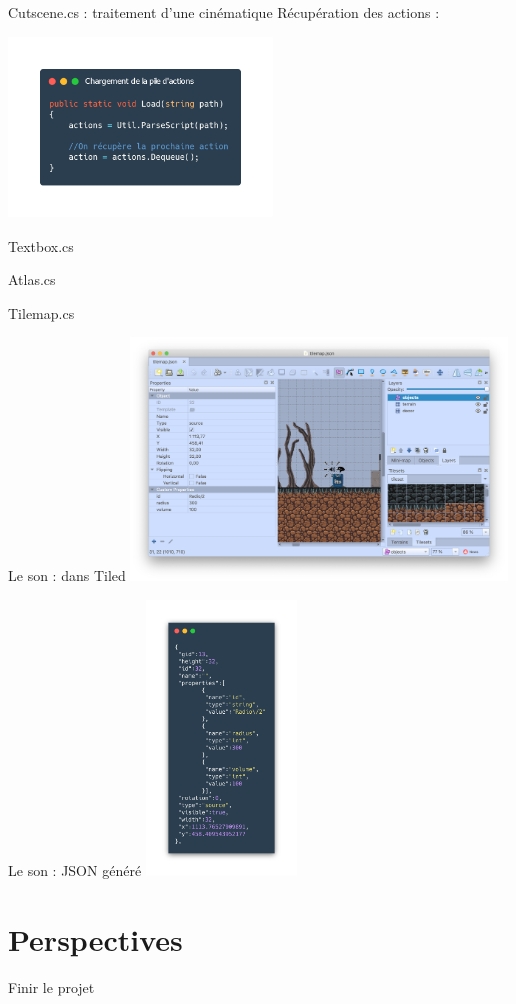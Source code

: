\documentclass{beamer}
\begin{document}
\begin{frame}{Cutscene.cs : traitement d'une cinématique}
    Récupération des actions : 

    \centering
    \includegraphics[width=7cm]{assets/pile_cutscene}
\end{frame}

\begin{frame}{Textbox.cs}
  
\end{frame}

\begin{frame}{Atlas.cs}
  
\end{frame}

\begin{frame}{Tilemap.cs}
  
\end{frame}

\begin{frame}{Le son : dans Tiled}
    \centering
    \includegraphics[width=10cm]{assets/tiledSon}
\end{frame}

\begin{frame}{Le son : JSON généré}
    \centering
    \includegraphics[width=4cm]{assets/jsonSource}
\end{frame}

\section{Perspectives}

\begin{frame}{Finir le projet}
  
\end{frame}
\end{document}

